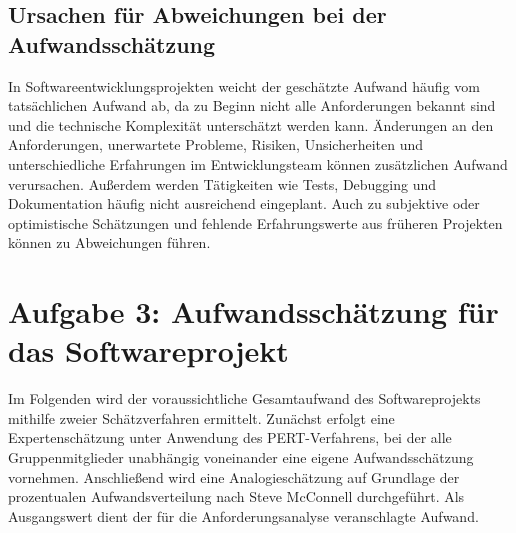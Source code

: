 \documentclass[a4paper,10pt]{article}
\begin{document}
        \subsection*{Ursachen für Abweichungen bei der Aufwandsschätzung}
        In Softwareentwicklungsprojekten weicht der geschätzte Aufwand häufig vom tatsächlichen Aufwand ab, da zu Beginn nicht alle Anforderungen bekannt sind und die technische Komplexität unterschätzt werden kann.
        Änderungen an den Anforderungen, unerwartete Probleme, Risiken, Unsicherheiten und unterschiedliche Erfahrungen im Entwicklungsteam können zusätzlichen Aufwand verursachen.
        Au\ss{}erdem werden Tätigkeiten wie Tests, Debugging und Dokumentation häufig nicht ausreichend eingeplant.
    Auch zu subjektive oder optimistische Schätzungen und fehlende Erfahrungswerte aus früheren Projekten können zu Abweichungen führen.


        \section*{Aufgabe 3: Aufwandsschätzung für das Softwareprojekt}
        Im Folgenden wird der voraussichtliche Gesamtaufwand des Softwareprojekts mithilfe zweier Schätzverfahren ermittelt. Zunächst erfolgt eine Expertenschätzung unter Anwendung des PERT-Verfahrens, bei der alle Gruppenmitglieder unabhängig voneinander eine eigene Aufwandsschätzung vornehmen.
        Anschlie\ss{}end wird eine Analogieschätzung auf Grundlage der prozentualen Aufwandsverteilung nach Steve McConnell durchgeführt.
    Als Ausgangswert dient der für die Anforderungsanalyse veranschlagte Aufwand.
\end{document}
